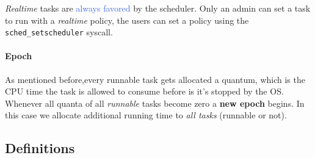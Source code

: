 \documentclass[openany,12pt]{book}
\newcommand{\code}[1]{\texttt{#1}}
\newcommand{\blue}[1]{\textcolor{RoyalBlue}{#1}}
\begin{document}
\textit{Realtime} tasks are \blue{always favored} by the scheduler. Only an admin can set a task to run with a \textit{realtime} policy, the users can set a policy using the \code{sched\_setscheduler} syscall.




\paragraph{Epoch} As mentioned before,every runnable task gets allocated a quantum, which is the CPU time the task is allowed to consume before is it's stopped by the OS. Whenever all quanta of all \textit{runnable} tasks become zero a \textbf{new epoch} begins. In this case we allocate additional running time to \textit{all tasks} (runnable or not).

\subsection*{Definitions}
\end{document}
